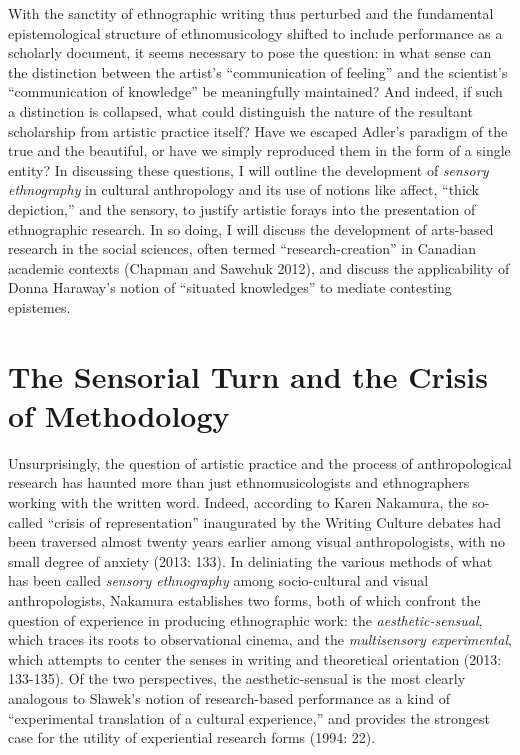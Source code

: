 With the sanctity of ethnographic writing thus perturbed and the
fundamental epistemological structure of ethnomusicology shifted to
include performance as a scholarly document, it seems necessary to pose
the question: in what sense can the distinction between the artist's
``communication of feeling'' and the scientist's ``communication of
knowledge'' be meaningfully maintained? And indeed, if such a
distinction is collapsed, what could distinguish the nature of the
resultant scholarship from artistic practice itself? Have we escaped
Adler's paradigm of the true and the beautiful, or have we simply
reproduced them in the form of a single entity? In discussing these
questions, I will outline the development of \emph{sensory ethnography}
in cultural anthropology and its use of notions like affect, ``thick
depiction,'' and the sensory, to justify artistic forays into the
presentation of ethnographic research. In so doing, I will discuss the
development of arts-based research in the social sciences, often termed
``research-creation'' in Canadian academic contexts (Chapman and Sawchuk
2012), and discuss the applicability of Donna Haraway's notion of
``situated knowledges'' to mediate contesting epistemes.

\hypertarget{the-sensorial-turn-and-the-crisis-of-methodology}{%
\section{The Sensorial Turn and the Crisis of
Methodology}\label{the-sensorial-turn-and-the-crisis-of-methodology}}

Unsurprisingly, the question of artistic practice and the process of
anthropological research has haunted more than just ethnomusicologists
and ethnographers working with the written word. Indeed, according to
Karen Nakamura, the so-called ``crisis of representation'' inaugurated
by the Writing Culture debates had been traversed almost twenty years
earlier among visual anthropologists, with no small degree of anxiety
(2013: 133). In deliniating the various methods of what has been called
\emph{sensory ethnography} among socio-cultural and visual
anthropologists, Nakamura establishes two forms, both of which confront
the question of experience in producing ethnographic work: the
\emph{aesthetic-sensual}, which traces its roots to observational
cinema, and the \emph{multisensory experimental}, which attempts to
center the senses in writing and theoretical orientation (2013:
133-135). Of the two perspectives, the aesthetic-sensual is the most
clearly analogous to Slawek's notion of research-based performance as a
kind of ``experimental translation of a cultural experience,'' and
provides the strongest case for the utility of experiential research
forms (1994: 22).


